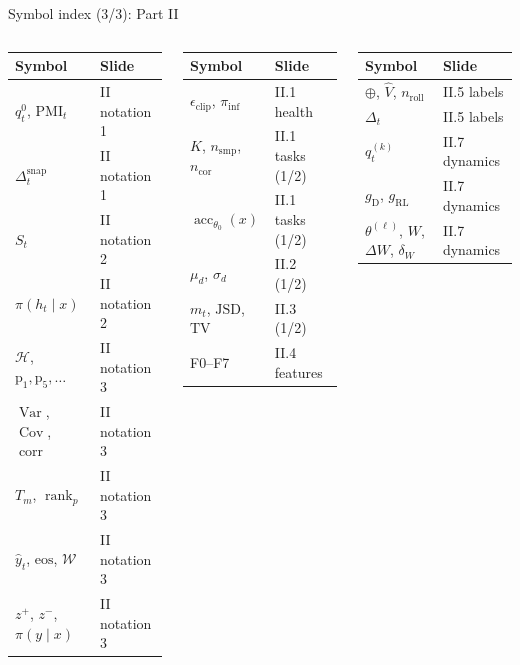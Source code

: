 \documentclass[aspectratio=169,11pt]{beamer}
\newcommand{\acc}{\operatorname{acc}}
\begin{document}
\begin{frame}{Symbol index (3/3): Part II}
\scriptsize
\setlength{\tabcolsep}{3pt}\renewcommand{\arraystretch}{1.15}
\begin{columns}[T]
\begin{tabular}{@{}ll@{}}
\toprule
\textbf{Symbol} & \textbf{Slide}\\ \midrule
$q^0_t$, $\mathrm{PMI}_t$ & II notation 1\\
$\Delta^{\mathrm{snap}}_t$ & II notation 1\\
$S_t$ & II notation 2\\
$\pi(h_t\mid x)$ & II notation 2\\
$\mathcal H$, $\mathrm p_1,\mathrm p_5,\dots$ & II notation 3\\
$\operatorname{Var}$, $\operatorname{Cov}$, $\operatorname{corr}$ & II notation 3\\
$T_m$, $\operatorname{rank}_p$ & II notation 3\\
$\hat y_t$, $\mathrm{eos}$, $\mathcal W$ & II notation 3\\
$z^+$, $z^-$, $\pi(y\mid x)$ & II notation 3\\
\bottomrule
\end{tabular}
\begin{tabular}{@{}ll@{}}
\toprule
\textbf{Symbol} & \textbf{Slide}\\ \midrule
$\epsilon_{\mathrm{clip}}$, $\pi_{\mathrm{inf}}$ & II.1 health\\
$K$, $n_{\mathrm{smp}}$, $n_{\mathrm{cor}}$ & II.1 tasks (1/2)\\
$\acc_{\theta_0}(x)$ & II.1 tasks (1/2)\\
$\mu_d$, $\sigma_d$ & II.2 (1/2)\\
$m_t$, $\mathrm{JSD}$, $\mathrm{TV}$ & II.3 (1/2)\\
F0--F7 & II.4 features\\
\bottomrule
\end{tabular}
\begin{tabular}{@{}ll@{}}
\toprule
\textbf{Symbol} & \textbf{Slide}\\ \midrule
$\oplus$, $\hat V$, $n_{\mathrm{roll}}$ & II.5 labels\\
$\Delta_t$ & II.5 labels\\
$q^{(k)}_t$ & II.7 dynamics\\
$g_{\mathrm D}$, $g_{\mathrm{RL}}$ & II.7 dynamics\\
$\theta^{(\ell)}$, $W$, $\Delta W$, $\delta_W$ & II.7 dynamics\\
\bottomrule
\end{tabular}
\end{columns}
\end{frame}
\end{document}

